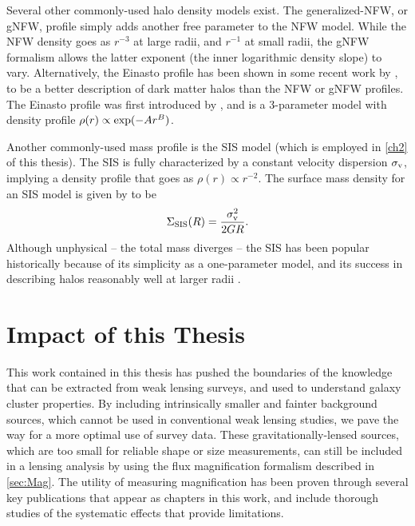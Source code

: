 Several other commonly-used halo density models exist. The generalized-\ac{NFW}, or g\ac{NFW}, profile simply adds another free parameter to the \ac{NFW} model. While the \ac{NFW} density goes as $r^{-3}$ at large radii, and $r^{-1}$ at small radii, the g\ac{NFW} formalism allows the latter exponent (the inner logarithmic density slope) to vary. Alternatively, the Einasto profile has been shown in some recent work by \citet{Dutton14}, to be a better description of dark matter halos than the \ac{NFW} or g\ac{NFW} profiles. The Einasto profile was first introduced by \citet{Einasto65}, and is a 3-parameter model with density profile $\rho(r) \propto {\rm exp}(-Ar^{B})$.

Another commonly-used mass profile is the \ac{SIS} model (which is employed in \autoref{ch2} of this thesis). The \ac{SIS} is fully characterized by a constant velocity dispersion $\sigma_{\rm v}$, implying a density profile that goes as $\rho(r) \propto r^{-2}$. The surface mass density for an \ac{SIS} model is given by \citet{BS01} to be
\begin{equation}
\Sigma_{\rm SIS}(R) = \frac{\sigma_{\rm v}^2}{2 G R}.
\end{equation}
Although unphysical -- the total mass diverges -- the \ac{SIS} has been popular historically because of its simplicity as a one-parameter model, and its success in describing halos reasonably well at larger radii \citep{Schneider06_WeakGravLens}.

\section{Impact of this Thesis}
\label{sec:Impact}

This work contained in this thesis has pushed the boundaries of the knowledge that can be extracted from weak lensing surveys, and used to understand galaxy cluster properties. By including intrinsically smaller and fainter background sources, which cannot be used in conventional weak lensing studies, we pave the way for a more optimal use of survey data. These gravitationally-lensed sources, which are too small for reliable shape or size measurements, can still be included in a lensing analysis by using the flux magnification formalism described in \autoref{sec:Mag}. The utility of measuring magnification has been proven through several key publications that appear as chapters in this work, and include thorough studies of the systematic effects that provide limitations. 

